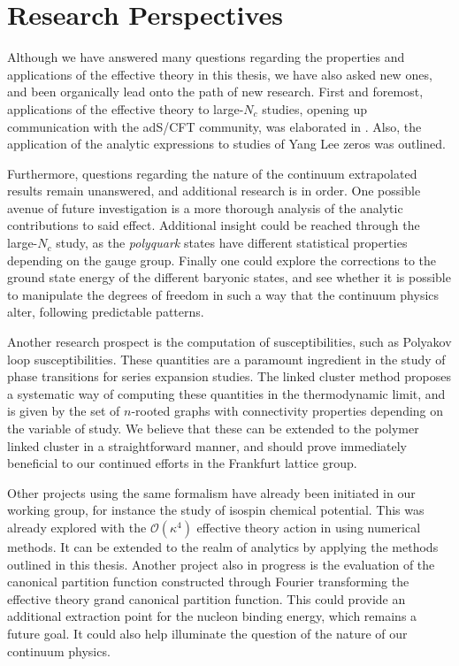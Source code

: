 \chapter{Research Perspectives}

Although we have answered many questions regarding the properties and
applications of the effective theory in this thesis, we have also asked new
ones, and been organically lead onto the path of new research. First and
foremost, applications of the effective theory to large-$N_c$ studies, opening
up communication with the adS/CFT community, was elaborated in
. Also, the application of the analytic expressions
to studies of Yang Lee zeros was outlined.

Furthermore, questions regarding the nature of the continuum extrapolated
results remain unanswered, and additional research is in order. One possible
avenue of future investigation is a more thorough analysis of the analytic
contributions to said effect. Additional insight could be reached through the
large-$N_c$ study, as the \emph{polyquark} states have different statistical
properties depending on the gauge group. Finally one could explore the
corrections to the ground state energy of the different baryonic states, and see
whether it is possible to manipulate the degrees of freedom in such a way that
the continuum physics alter, following predictable patterns.

Another research prospect is the computation of susceptibilities, such as
Polyakov loop susceptibilities. These quantities are a paramount ingredient in
the study of phase transitions for series expansion studies. The linked cluster
method proposes a systematic way of computing these quantities in the
thermodynamic limit, and is given by the set of $n$-rooted graphs with
connectivity properties depending on the variable of study. We believe that
these can be extended to the polymer linked cluster in a straightforward manner,
and should prove immediately beneficial to our continued efforts in the
Frankfurt lattice group.

Other projects using the same formalism have already been initiated in our
working group, for instance the study of isospin chemical potential. This was
already explored with the $\mathcal{O}(\kappa^4)$ effective theory action in
\citep{Langelage:2014vpa} using numerical methods. It can be extended to the
realm of analytics by applying the methods outlined in this thesis. Another
project also in progress is the evaluation of the canonical partition function
constructed through Fourier transforming the effective theory grand canonical
partition function. This could provide an additional extraction point for the
nucleon binding energy, which remains a future goal. It could also help
illuminate the question of the nature of our continuum physics.

